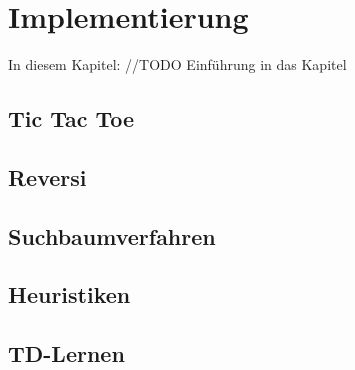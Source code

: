 \chapter{Implementierung}
\label{cha:Implementierung}

In diesem Kapitel: //TODO Einführung in das Kapitel

\section{Tic Tac Toe}

\section{Reversi}

\section{Suchbaumverfahren}

\section{Heuristiken}

\section{TD-Lernen}
